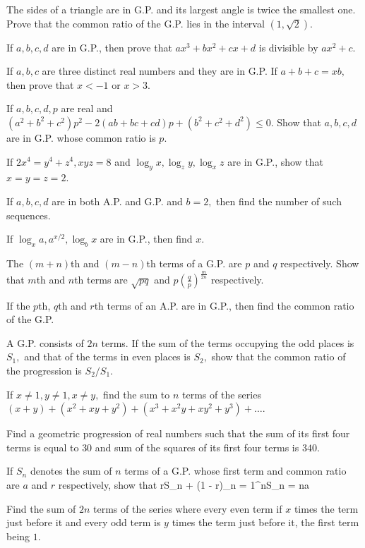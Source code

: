 \item The sides of a triangle are in G.P. and its largest angle is twice the smallest one. Prove that the common ratio of
  the G.P. lies in the interval $(1, \sqrt{2})$.
\item If $a, b, c, d$ are in G.P., then prove that $ax^3 + bx^2 + cx + d$ is divisible by $ax^2 + c$.
\item If $a, b, c$ are three distinct real numbers and they are in G.P. If $a + b + c = xb,$ then prove that $x < -1$ or
  $x > 3$.
\item If $a, b, c, d, p$ are real and $(a^2 + b^2 + c^2)p^2 - 2(ab + bc + cd)p + (b^2 + c^2 + d^2)\leq 0.$ Show that $a,
  b, c, d$ are in G.P. whose common ratio is $p$.
\item If $2x^4 = y^4 + z^4, xyz = 8$ and $\log_yx, \log_zy, \log_xz$ are in G.P., show that $x = y = z = 2$.
\item If $a, b, c, d$ are in both A.P. and G.P. and $b = 2,$ then find the number of such sequences.
\item If $\log_x a, a^{x/2}, \log_b x$ are in G.P., then find $x.$
\item The $(m + n)$th and $(m - n)$th terms of a G.P. are $p$ and $q$ respectively. Show that $m$th and $n$th terms are
  $\sqrt{pq}$ and $p\left(\frac{q}{p}\right)^{\frac{m}{2n}}$ respectively.
\item If the $p$th, $q$th and $r$th terms of an A.P. are in G.P., then find the common ratio of the G.P.
\item A G.P. consists of $2n$ terms. If the sum of the terms occupying the odd places is $S_1,$ and that of the terms in
  even places is $S_2,$ show that the common ratio of the progression is $S_2/S_1$.
\item If $x\neq 1, y\neq 1, x \neq y,$ find the sum to $n$ terms of the series $(x + y) + (x^2 + xy + y^2) + (x^3 + x^2y +
  xy^2 + y^3) + \ldots$.
\item Find a geometric progression of real numbers such that the sum of its first four terms is equal to $30$ and sum of
  the squares of its first four terms is $340$.
\item If $S_n$ denotes the sum of $n$ terms of a G.P. whose first term and common ratio are $a$ and $r$ respectively, show
  that \startformula rS_n + (1 - r)\sum_{n = 1}^nS_n = na\stopformula
\item Find the sum of $2n$ terms of the series where every even term if $x$ times the term just before it and every odd
  term is $y$ times the term just before it, the first term being $1$.
